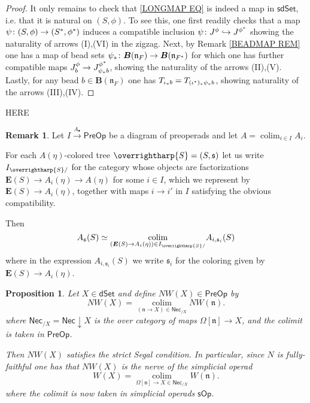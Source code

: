 \documentclass[a4paper,10pt
,draft
]{article}%
\numberwithin{equation}{section}
\numberwithin{figure}{section}
\newtheorem{proposition}[equation]{Proposition}%
\theoremstyle{definition} %
\newtheorem{remark}[equation]{Remark}%
\newcommand{\vect}[1]{\text{\overrightharp{\ensuremath{#1}}}}
\DeclareMathOperator{\colim}{colim}%
\newcommand{\1}{\ensuremath{\mathbbm 1}}%
\begin{document}
\begin{proof}
	It only remains to check that
	\eqref{LONGMAP EQ}
	is indeed a map in 
	$\mathsf{sdSet}$, i.e. that it is natural on 
	$(S,\phi)$.
	To see this, one first readily checks that a map
	$\psi \colon (S,\phi) \to (S^{\**},\phi^{\**})$
	induces a compatible inclusion
	$\psi \colon J^{\phi} \hookrightarrow J^{\phi^{\**}}$
	showing the naturality of arrows (I),(VI) 
	in the zigzag.
%
	Next, by Remark \ref{BEADMAP REM}
	one has a map of bead sets
	$\psi_{\**} \colon 
	\boldsymbol{B}(\mathfrak{n}_{F})
	\to
	\boldsymbol{B}(\mathfrak{n}_{F^{\**}})$
	for which one has further compatible maps
	$J^{\phi}_b
	\to 
	J^{\phi^{\**}}_{\psi_{\**}b}$,
	showing the naturality of the arrows (II),(V).
	Lastly, for any bead 
	$b \in \boldsymbol{B}(\mathfrak{n}_{F})$
	one has
	$T_{\iota_{\**}b} = T_{(\iota^{\**})_{\**} \psi_{\**}b}$,
	showing naturality of the arrows (III),(IV).
\end{proof}



{\color{red} HERE}



\begin{remark}\label{PREOPCOLEV REM}
	Let $I \xrightarrow{A_{\bullet}} \mathsf{PreOp}$
	be a diagram of preoperads and let
	$A = \colim_{i \in I} A_i$.
	
	For each $A(\eta)$-colored tree 
	$\vect{S} = (S,\mathfrak{s})$
	let us write
	$I_{\vect{S}/}$
	for the category whose objects are factorizations
	$\boldsymbol{E}(S) \to A_i(\eta) \to A(\eta)$ 
	for some $i \in I$,
	which we represent by 
	$\boldsymbol{E}(S) \to A_i(\eta)$,
	together with maps $i \to i'$ in $I$
	satisfying the obvious compatibility.
	
	Then
\begin{equation}\label{COLIMALT EQ}
	A_{\mathfrak{s}}(S) \simeq 
	\underset{(\boldsymbol{E}(S) \to A_i(\eta)) \in I_{\vect{S}/}}{\colim}
	A_{i,
	\mathfrak{s}_i}(S)
\end{equation}
	where in the expression 
	$A_{i,\mathfrak{s}_i}(S)$
	we write 
	$\mathfrak{s}_i$
	for the coloring given by
	$\boldsymbol{E}(S) \to A_i(\eta)$.
\end{remark}





\begin{proposition}
	\label{NWKANEX_PROP}
	Let $X \in \mathsf{dSet}$ and define
	$NW(X) \in \mathsf{PreOp}$ by
	\begin{equation}\label{NWKANEX EQ}
	NW(X) =
	\underset{(\mathfrak{n} \to X)
		\in \mathsf{Nec}_{/X}}{\colim}
	NW(\mathfrak{n}).
	\end{equation}
	where
	$\mathsf{Nec}_{/X} = \mathsf{Nec} \downarrow X$ is the over category of maps $\Omega[\mathfrak{n}] \to X$, and
	the colimit is taken in $\mathsf{PreOp}$.

        Then $NW(X)$ satisfies the strict Segal condition.
	In particular, since $N$ is fully-faithful one has that
	$NW(X)$ is the nerve of the simplicial operad
\[
	W(X) =
	\underset{\Omega[\mathfrak{n}] \to X
	\in \mathsf{Nec}_{/X}}{\colim}
	W(\mathfrak{n}).
\]
	where the colimit is now taken in simplicial operads
	$\mathsf{sOp}$.
\end{proposition}
\end{document}
